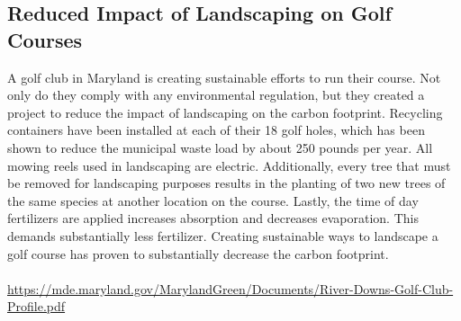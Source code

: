 \documentclass{article}
\begin{document}
\begin{spacing}{2.15}
    \section{Reduced Impact of Landscaping on Golf Courses}
    \indent A golf club in Maryland is creating sustainable efforts to run their course. Not only do they comply with any environmental regulation, but they created a project to reduce the impact of landscaping on the carbon footprint. Recycling containers have been installed at each of their 18 golf holes, which has been shown to reduce the municipal waste load by about 250 pounds per year. All mowing reels used in landscaping are electric. Additionally, every tree that must be removed for landscaping purposes results in the planting of two new trees of the same species at another location on the course. Lastly, the time of day fertilizers are applied increases absorption and decreases evaporation. This demands substantially less fertilizer. Creating sustainable ways to landscape a golf course has proven to substantially decrease the carbon footprint.\\\\
    \url{https://mde.maryland.gov/MarylandGreen/Documents/River-Downs-Golf-Club-Profile.pdf}
    \end{spacing}
\end{document}
